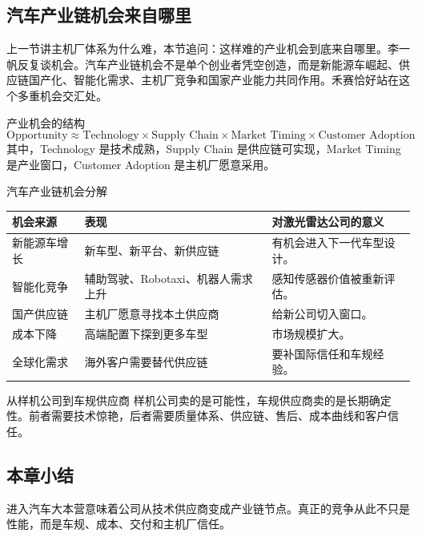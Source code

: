 \documentclass[a4paper]{article}
\begin{document}
\subsection{汽车产业链机会来自哪里}

上一节讲主机厂体系为什么难，本节追问：这样难的产业机会到底来自哪里。李一帆反复谈机会。汽车产业链机会不是单个创业者凭空创造，而是新能源车崛起、供应链国产化、智能化需求、主机厂竞争和国家产业能力共同作用。禾赛恰好站在这个多重机会交汇处。

\begin{importantbox}{产业机会的结构}
\[
\text{Opportunity} \approx \text{Technology} \times \text{Supply Chain} \times \text{Market Timing} \times \text{Customer Adoption}
\]
其中，Technology 是技术成熟，Supply Chain 是供应链可实现，Market Timing 是产业窗口，Customer Adoption 是主机厂愿意采用。
\end{importantbox}

\begin{knowledgebox}{汽车产业链机会分解}
\begin{tabularx}{\textwidth}{p{}p{}X}
\toprule
机会来源 & 表现 & 对激光雷达公司的意义 \\
\midrule
新能源车增长 & 新车型、新平台、新供应链 & 有机会进入下一代车型设计。 \\
智能化竞争 & 辅助驾驶、Robotaxi、机器人需求上升 & 感知传感器价值被重新评估。 \\
国产供应链 & 主机厂愿意寻找本土供应商 & 给新公司切入窗口。 \\
成本下降 & 高端配置下探到更多车型 & 市场规模扩大。 \\
全球化需求 & 海外客户需要替代供应链 & 要补国际信任和车规经验。 \\
\bottomrule
\end{tabularx}
\end{knowledgebox}

\begin{importantbox}{从样机公司到车规供应商}
样机公司卖的是可能性，车规供应商卖的是长期确定性。前者需要技术惊艳，后者需要质量体系、供应链、售后、成本曲线和客户信任。
\end{importantbox}

\subsection{本章小结}

进入汽车大本营意味着公司从技术供应商变成产业链节点。真正的竞争从此不只是性能，而是车规、成本、交付和主机厂信任。
\end{document}
